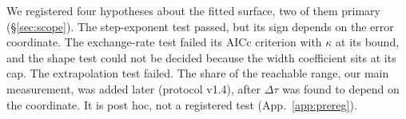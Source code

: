 We registered four hypotheses about the fitted surface, two of them primary
(\S\ref{sec:scope}). The step-exponent test passed, but its sign depends on the error
coordinate. The exchange-rate test failed its AICc criterion with $\kappa$ at its bound, and
the shape test could not be decided because the width coefficient sits at its cap. The extrapolation test failed. The share of the reachable range, our main
measurement, was added later (protocol v1.4), after $\Delta\tau$ was found to depend on the
coordinate. It is post hoc, not a registered test (App.~\ref{app:prereg}).
